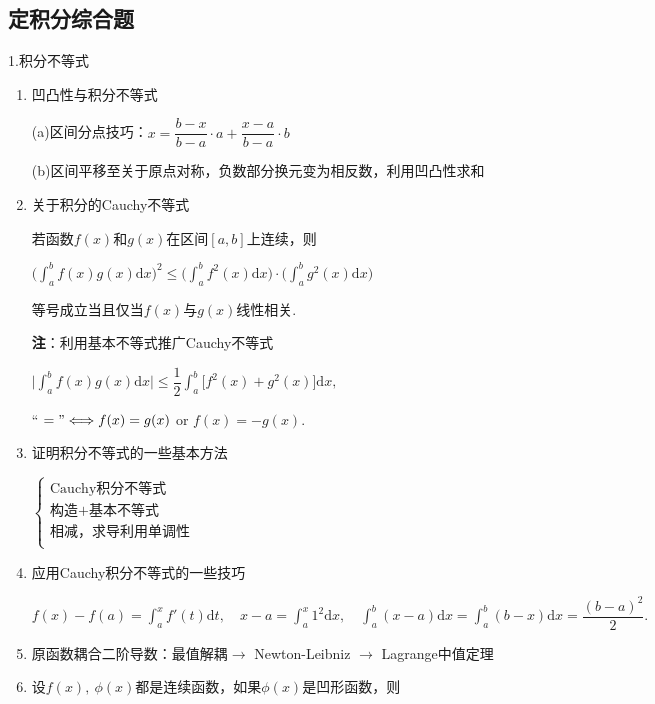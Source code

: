 \documentclass[UTF8]{ctexart}
\numberwithin{equation}{section}
\numberwithin{figure}{section}
\numberwithin{table}{section}
\newcommand\dif{\mathrm{d}}
\newcommand\no{\noindent}
\newcommand\dis{\displaystyle}
\newcommand\ls{\leqslant}
\newcommand\intd{\dis\int}
\newcommand\intab{\dis\int_a^b}
\begin{document}
\begin{spacing}{2}
\begin{enumerate}[itemindent=1.4em, label=(\arabic*)]
\end{enumerate}

\subsection{定积分综合题}

\no1.积分不等式

\begin{enumerate}[itemindent=1.4em, label=(\arabic*)]

\item 凹凸性与积分不等式

(a)区间分点技巧：$\dis x=\dfrac{b-x}{b-a}\cdot a+\dfrac{x-a}{b-a}\cdot b$

(b)区间平移至关于原点对称，负数部分换元变为相反数，利用凹凸性求和

\item 关于积分的Cauchy不等式

若函数$f(x)$和$g(x)$在区间$[a,b]$上连续，则

\centerline{$\Bigg(\intab f(x)g(x)\dif x\Bigg)^2\ls\Bigg(\intab f^2(x)\dif x\Bigg)\cdot
\Bigg(\intab g^2(x)\dif x\Bigg)$}

等号成立当且仅当$f(x)$与$g(x)$线性相关.

\textbf{注}：利用基本不等式推广Cauchy不等式

\centerline{$\Bigg|\intab f(x)g(x)\dif x\Bigg|\ls\dfrac{1}{2}\intab \big[f^2(x)+g^2(x)\big]\dif x,$}

``$\ ="\Longleftrightarrow f(x)=g(x)$ or $f(x)=-g(x).$

\item 证明积分不等式的一些基本方法

$\left\{\begin{array}{l}
\text{Cauchy积分不等式}\\
\text{构造}+\text{基本不等式}\\
\text{相减，求导利用单调性}\\
\end{array}\right.$

\item 应用Cauchy积分不等式的一些技巧

$f(x)-f(a)=\intd_a^x f'(t)\dif t,\quad x-a=\intd_a^x 1^2\dif x,
\quad \intab (x-a)\dif x=\intab (b-x)\dif x=\dfrac{(b-a)^2}{2}.$

\item 原函数耦合二阶导数：最值解耦$\longrightarrow$ Newton-Leibniz
$\longrightarrow$ Lagrange中值定理

\item 设$f(x),\ \phi(x)$都是连续函数，如果$\phi(x)$是凹形函数，则


\end{enumerate}
\end{spacing}
\end{document}
